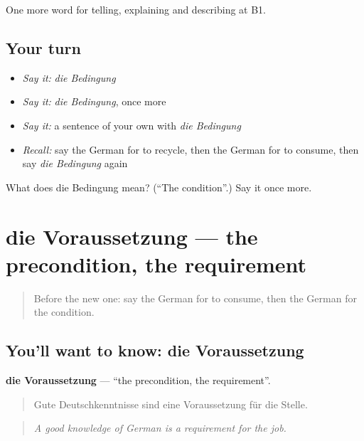 \begin{grammarlens}[title={What you've built}]
One more word for telling, explaining and describing at B1.
\end{grammarlens}

\subsection*{Your turn}
\begin{itemize}
\raggedright
  \item \emph{Say it:} \emph{die Bedingung}
  \item \emph{Say it:} \emph{die Bedingung}, once more
  \item \emph{Say it:} a sentence of your own with \emph{die Bedingung}
  \item \emph{Recall:} say the German for to recycle, then the German for to consume, then say \emph{die Bedingung} again
\end{itemize}

\begin{tcolorbox}[breakable,colback=teal!4,colframe=teal!35!black,title={Before you move on}]
What does die Bedingung mean? (\textquotedblleft{}The condition\textquotedblright{}.) Say it once more.
\end{tcolorbox}
\section[die Voraussetzung]{die Voraussetzung — the precondition, the requirement}

\label{lesson:GE-C364-voraussetzung}



\begin{quote}
Before the new one: say the German for to consume, then the German for the condition.
\end{quote}

\subsection*{You'll want to know: die Voraussetzung}
\textbf{die Voraussetzung} — \textquotedblleft{}the precondition, the requirement\textquotedblright{}.

\begin{quote}
Gute Deutschkenntnisse sind eine Voraussetzung für die Stelle.
\end{quote}

\begin{quote}
\emph{A good knowledge of German is a requirement for the job.}
\end{quote}


